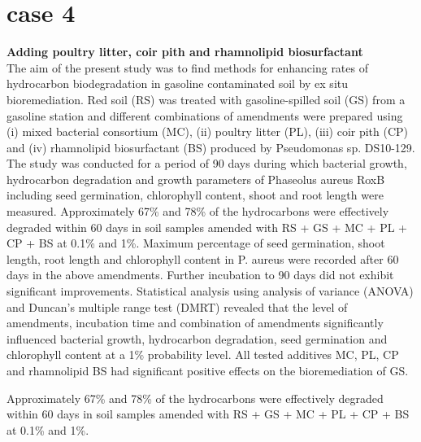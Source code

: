 \documentclass[twocolumn]{article} %
\begin{document}
\section{case 4}
\textbf{Adding poultry litter, coir pith and rhamnolipid biosurfactant}\cite{4}\\
The aim of the present study was to find methods for enhancing rates of hydrocarbon biodegradation in gasoline contaminated soil by ex situ bioremediation. Red soil (RS) was treated with gasoline-spilled soil (GS) from a gasoline station and different combinations of amendments were prepared using (i) mixed bacterial consortium (MC), (ii) poultry litter (PL), (iii) coir pith (CP) and (iv) rhamnolipid biosurfactant (BS) produced by Pseudomonas sp. DS10-129. The study was conducted for a period of 90 days during which bacterial growth, hydrocarbon degradation and growth parameters of Phaseolus aureus RoxB including seed germination, chlorophyll content, shoot and root length were measured. Approximately 67\% and 78\% of the hydrocarbons were effectively degraded within 60 days in soil samples amended with RS + GS + MC + PL + CP + BS at 0.1\% and 1\%. Maximum percentage of seed germination, shoot length, root length and chlorophyll content in P. aureus were recorded after 60 days in the above amendments. Further incubation to 90 days did not exhibit significant improvements. Statistical analysis using analysis of variance (ANOVA) and Duncan's multiple range test (DMRT) revealed that the level of amendments, incubation time and combination of amendments significantly influenced bacterial growth, hydrocarbon degradation, seed germination and chlorophyll content at a 1\% probability level. All tested additives MC, PL, CP and rhamnolipid BS had significant positive effects on the bioremediation of GS.

Approximately 67\% and 78\% of the hydrocarbons were effectively degraded within 60 days in soil samples amended with RS + GS + MC + PL + CP + BS at 0.1\% and 1\%.
\end{document}
